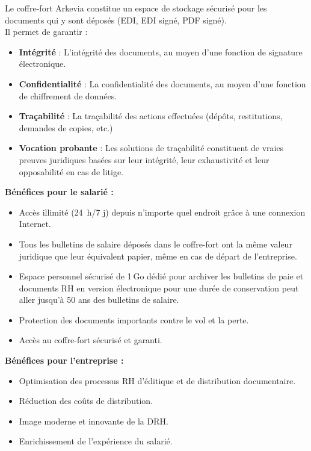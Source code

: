Le coffre-fort Arkevia constitue un espace de stockage sécurisé pour les documents qui y sont déposés (EDI, EDI signé, PDF signé).\\
Il permet de garantir :
\begin{itemize}
    \item \textbf{Intégrité} : L'intégrité des documents, au moyen d’une fonction de signature électronique.
    \item \textbf{Confidentialité} : La confidentialité des documents, au moyen d’une fonction de chiffrement de données.
    \item \textbf{Traçabilité} : La traçabilité des actions effectuées (dépôts, restitutions, demandes de copies, etc.)
    \item \textbf{Vocation probante} : Les solutions de traçabilité constituent de vraies preuves juridiques basées sur leur intégrité, leur exhaustivité et leur opposabilité en cas de litige.\\
\end{itemize}
\newpage
\noindent
\textbf{Bénéfices pour le salarié :}
\begin{itemize}
    \item Accès illimité (24 h/7 j) depuis n’importe quel endroit grâce à une connexion Internet.
    \item Tous les bulletins de salaire déposés dans le coffre-fort ont la même valeur juridique que leur équivalent papier, même en cas de départ de l’entreprise.
    \item Espace personnel sécurisé de 1 Go dédié pour archiver les bulletins de paie et documents RH en version électronique pour une durée de conservation peut aller jusqu'à 50 ans des bulletins de salaire.
    \item Protection des documents importants contre le vol et la perte.
    \item Accès au coffre-fort sécurisé et garanti.\\
\end{itemize}

\noindent
\textbf{Bénéfices pour l’entreprise :}
\begin{itemize}
    \item Optimisation des processus RH d’éditique et de distribution documentaire.
    \item Réduction des coûts de distribution.
    \item Image moderne et innovante de la DRH.
    \item Enrichissement de l’expérience du salarié.
\end{itemize}
